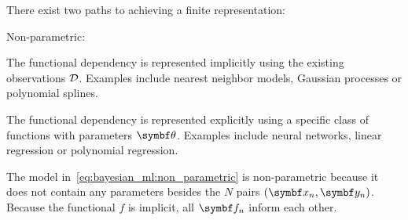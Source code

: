 There exist two paths to achieving a finite representation:
\begin{labeling}{Non-parametric:}
    \item[Non-parametric:] The functional dependency is represented implicitly using the existing observations $\mathcal{D}$. Examples include nearest neighbor models, Gaussian processes or polynomial splines.
    \item[Parametric:] The functional dependency is represented explicitly using a specific class of functions with parameters $\mat{\theta}$. Examples include neural networks, linear regression or polynomial regression.
\end{labeling}
The model in~\cref{eq:bayesian_ml:non_parametric} is non-parametric because it does not contain any parameters besides the $N$ pairs $(\mat{x}_n, \mat{y}_n)$.
Because the functional $f$ is implicit, all $\mat{f}_n$ inform each other.

